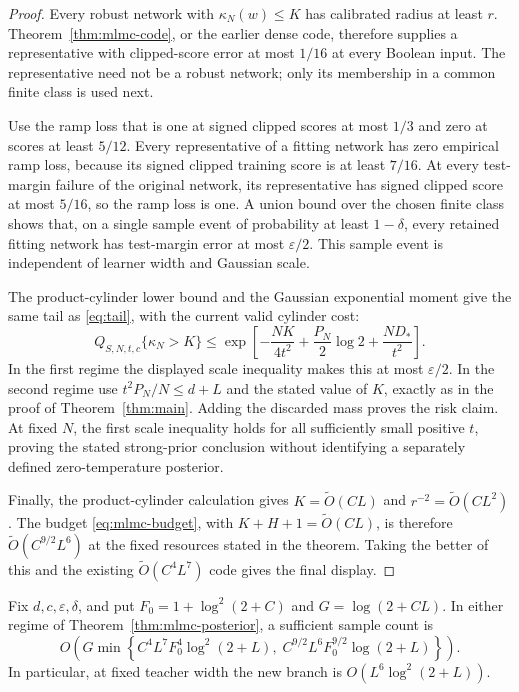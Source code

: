 \begin{proof}
Every robust network with $\kappa_N(w)\le K$ has calibrated radius at
least $r$. Theorem~\ref{thm:mlmc-code}, or the earlier dense code,
therefore supplies a representative with clipped-score error at most
$1/16$ at every Boolean input. The representative need not be a robust
network; only its membership in a common finite class is used next.

Use the ramp loss that is one at signed clipped scores at most $1/3$
and zero at scores at least $5/12$. Every representative of a fitting
network has zero empirical ramp loss, because its signed clipped
training score is at least $7/16$. At every test-margin failure of the
original network, its representative has signed clipped score at most
$5/16$, so the ramp loss is one. A union bound over the chosen finite
class shows that, on a single sample event of probability at least
$1-\delta$, every retained fitting network has test-margin error at
most $\varepsilon/2$. This sample event is independent of learner width
and Gaussian scale.

The product-cylinder lower bound and the Gaussian exponential moment give
the same tail as \eqref{eq:tail}, with the current valid cylinder cost:
\[
 Q_{S,N,t,c}\{\kappa_N>K\}
 \le\exp\!\left[-\frac{NK}{4t^2}
       +\frac{P_N}{2}\log2+\frac{ND_*}{t^2}\right].
\]
In the first regime the displayed scale inequality makes this at most
$\varepsilon/2$. In the second regime use
$t^2P_N/N\le d+L$ and the stated value of $K$, exactly as in the proof
of Theorem~\ref{thm:main}. Adding the discarded mass proves the risk
claim. At fixed $N$, the first scale inequality holds for all sufficiently
small positive $t$, proving the stated strong-prior conclusion without
identifying a separately defined zero-temperature posterior.

Finally, the product-cylinder calculation gives
$K=\widetilde O(CL)$ and $r^{-2}=\widetilde O(CL^2)$.
The budget \eqref{eq:mlmc-budget}, with $K+H+1=\widetilde O(CL)$,
is therefore $\widetilde O(C^{9/2}L^6)$ at the fixed resources stated
in the theorem. Taking the better of this and the existing
$\widetilde O(C^4L^7)$ code gives the final display.
\end{proof}

\begin{corollary}
\label{cor:mlmc-powers}
Fix $d,c,\varepsilon,\delta$, and put
$F_0=1+\log^2(2+C)$ and $G=\log(2+CL)$.
In either regime of Theorem~\ref{thm:mlmc-posterior}, a sufficient
sample count is
\[
 O\!\left(G\min\left\{
 C^4L^7F_0^4\log^2(2+L),\;
 C^{9/2}L^6F_0^{9/2}\log(2+L)
 \right\}\right).
\]
In particular, at fixed teacher width the new branch is
$O(L^6\log^2(2+L))$.
\end{corollary}

